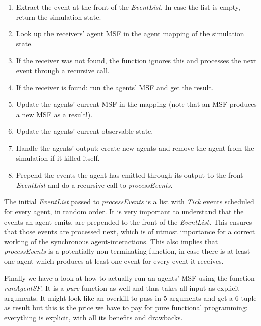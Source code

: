 \begin{enumerate}
	\item Extract the event at the front of the \textit{EventList}. In case the list is empty, return the simulation state.
	\item Look up the receivers' agent MSF in the agent mapping of the simulation state.
	\item If the receiver was not found, the function ignores this and processes the next event through a recursive call.
	\item If the receiver is found: run the agents' MSF and get the result.
	\item Update the agents' current MSF in the mapping (note that an MSF produces a new MSF as a result!).
	\item Update the agents' current observable state.
	\item Handle the agents' output: create new agents and remove the agent from the simulation if it killed itself.
	\item Prepend the events the agent has emitted through its output to the front \textit{EventList} and do a recursive call to \textit{processEvents}.
\end{enumerate}

The initial \textit{EventList} passed to \textit{processEvents} is a list with \textit{Tick} events scheduled for every agent, in random order. It is very important to understand that the events an agent emits, are prepended to the front of the \textit{EventList}. This ensures that those events are processed next, which is of utmost importance for a correct working of the synchronous agent-interactions. This also implies that \textit{processEvents} is a potentially non-terminating function, in case there is at least one agent which produces at least one event for every event it receives.

Finally we have a look at how to actually run an agents' MSF using the function \textit{runAgentSF}. It is a \textit{pure} function as well and thus takes all input as explicit arguments. It might look like an overkill to pass in 5 arguments and get a 6-tuple as result but this is the price we have to pay for pure functional programming: everything is explicit, with all its benefits and drawbacks.

